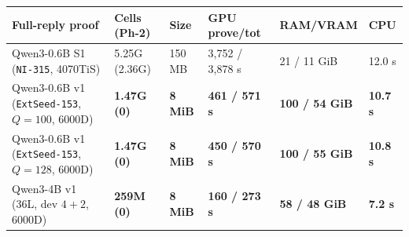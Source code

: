 \documentclass[10pt]{article}
\begin{document}
\begin{center}\small
\begin{tabularx}{\linewidth}{>{\hsize}Y>{\hsize}Y>{\hsize}Y>{\hsize}Y>{\hsize}Y>{\hsize}Y}
\toprule
{}\textbf{Full-reply proof} & {}\textbf{Cells (Ph-2)} & {}\textbf{Size} & {}\textbf{GPU prove/tot} & {}\textbf{RAM/VRAM} & {}\textbf{CPU} \\
\midrule
{}Qwen3-0.6B S1 (\texttt{NI-315}, 4070TiS) & {}5.25G (2.36G) & {}150 MB & {}3,752 / 3,878 s & {}21 / 11 GiB & {}12.0 s \\
{}Qwen3-0.6B v1 (\texttt{ExtSeed-153}, $Q=100$, 6000D) & {}\textbf{1.47G (0)} & {}\textbf{8 MiB} & {}\textbf{461 / 571 s} & {}\textbf{100 / 54 GiB} & {}\textbf{10.7 s} \\
{}Qwen3-0.6B v1 (\texttt{ExtSeed-153}, \textbf{$Q=128$}, 6000D) & {}\textbf{1.47G (0)} & {}\textbf{8 MiB} & {}\textbf{450 / 570 s} & {}\textbf{100 / 55 GiB} & {}\textbf{10.8 s} \\
{}Qwen3-4B v1 (36L, dev $4+2$, 6000D) & {}\textbf{259M (0)} & {}\textbf{8 MiB} & {}\textbf{160 / 273 s} & {}\textbf{58 / 48 GiB} & {}\textbf{7.2 s} \\
\bottomrule
\end{tabularx}
\end{center}
\end{document}
